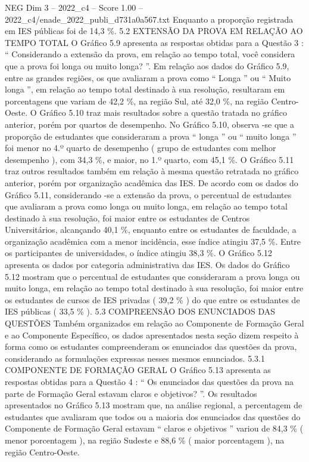 \begin{textsample}{NEG Dim 3 – 2022\_c4 – Score 1.00 – 2022\_c4/enade\_2022\_publi\_d731a0a567.txt}
Enquanto a proporção registrada em IES públicas foi de 14,3 \%. 5.2 EXTENSÃO DA PROVA EM RELAÇÃO AO TEMPO TOTAL O Gráfico 5.9 apresenta as respostas obtidas para a Questão 3 : “ Considerando a extensão da prova, em relação ao tempo total, você considera que a prova foi longa ou muito longa? ”.
Em relação aos dados do Gráfico 5.9, entre as grandes regiões, os que avaliaram a prova como “ Longa ” ou “ Muito longa ”, em relação ao tempo total destinado à sua resolução, resultaram em porcentagens que variam de 42,2 \%, na região Sul, até 32,0 \%, na região Centro-Oeste.
O Gráfico 5.10 traz mais resultados sobre a questão tratada no gráfico anterior, porém por quartos de desempenho.
No Gráfico 5.10, observa -se que a proporção de estudantes que consideraram a prova “ longa ” ou “ muito longa ” foi menor no 4.º quarto de desempenho ( grupo de estudantes com melhor desempenho ), com 34,3 \%, e maior, no 1.º quarto, com 45,1 \%.
O Gráfico 5.11 traz outros resultados também em relação à mesma questão retratada no gráfico anterior, porém por organização acadêmica das IES.
De acordo com os dados do Gráfico 5.11, considerando -se a extensão da prova, o percentual de estudantes que avaliaram a prova como longa ou muito longa, em relação ao tempo total destinado à sua resolução, foi maior entre os estudantes de Centros Universitários, alcançando 40,1 \%, enquanto entre os estudantes de faculdade, a organização acadêmica com a menor incidência, esse índice atingiu 37,5 \%.
Entre os participantes de universidades, o índice atingiu 38,3 \%.
O Gráfico 5.12 apresenta os dados por categoria administrativa das IES.
Os dados do Gráfico 5.12 mostram que o percentual de estudantes que consideraram a prova longa ou muito longa, em relação ao tempo total destinado à sua resolução, foi maior entre os estudantes de cursos de IES privadas ( 39,2 \% ) do que entre os estudantes de IES públicas ( 33,5 \% ). 5.3 COMPREENSÃO DOS ENUNCIADOS DAS QUESTÕES Também organizados em relação ao Componente de Formação Geral e ao Componente Específico, os dados apresentados nesta seção dizem respeito à forma como os estudantes compreenderam os enunciados das questões da prova, considerando as formulações expressas nesses mesmos enunciados. 5.3.1 COMPONENTE DE FORMAÇÃO GERAL O Gráfico 5.13 apresenta as respostas obtidas para a Questão 4 : “ Os enunciados das questões da prova na parte de Formação Geral estavam claros e objetivos? ”.
Os resultados apresentados no Gráfico 5.13 mostram que, na análise regional, a percentagem de estudantes que avaliaram que todos ou a maioria dos enunciados das questões do Componente de Formação Geral estavam “ claros e objetivos ” variou de 84,3 \% ( menor porcentagem ), na região Sudeste e 88,6 \% ( maior porcentagem ), na região Centro-Oeste.

\end{textsample}
